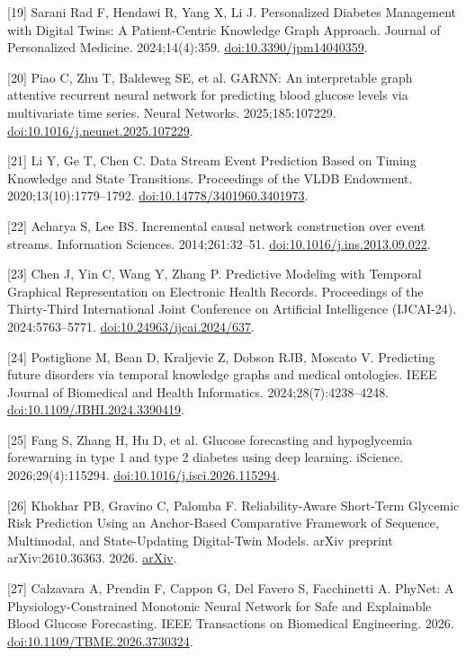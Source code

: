\documentclass[11pt,a4paper]{article}
\begin{document}
[19] Sarani Rad F, Hendawi R, Yang X, Li J. Personalized Diabetes Management with Digital Twins: A Patient-Centric Knowledge Graph Approach. Journal of Personalized Medicine. 2024;14(4):359. \href{https://doi.org/10.3390/jpm14040359}{doi:10.3390/jpm14040359}.

[20] Piao C, Zhu T, Baldeweg SE, et al. GARNN: An interpretable graph attentive recurrent neural network for predicting blood glucose levels via multivariate time series. Neural Networks. 2025;185:107229. \href{https://doi.org/10.1016/j.neunet.2025.107229}{doi:10.1016/j.neunet.2025.107229}.

[21] Li Y, Ge T, Chen C. Data Stream Event Prediction Based on Timing Knowledge and State Transitions. Proceedings of the VLDB Endowment. 2020;13(10):1779--1792. \href{https://doi.org/10.14778/3401960.3401973}{doi:10.14778/3401960.3401973}.

[22] Acharya S, Lee BS. Incremental causal network construction over event streams. Information Sciences. 2014;261:32--51. \href{https://doi.org/10.1016/j.ins.2013.09.022}{doi:10.1016/j.ins.2013.09.022}.

[23] Chen J, Yin C, Wang Y, Zhang P. Predictive Modeling with Temporal Graphical Representation on Electronic Health Records. Proceedings of the Thirty-Third International Joint Conference on Artificial Intelligence (IJCAI-24). 2024:5763--5771. \href{https://doi.org/10.24963/ijcai.2024/637}{doi:10.24963/ijcai.2024/637}.

[24] Postiglione M, Bean D, Kraljevic Z, Dobson RJB, Moscato V. Predicting future disorders via temporal knowledge graphs and medical ontologies. IEEE Journal of Biomedical and Health Informatics. 2024;28(7):4238--4248. \href{https://doi.org/10.1109/JBHI.2024.3390419}{doi:10.1109/JBHI.2024.3390419}.

[25] Fang S, Zhang H, Hu D, et al. Glucose forecasting and hypoglycemia forewarning in type 1 and type 2 diabetes using deep learning. iScience. 2026;29(4):115294. \href{https://doi.org/10.1016/j.isci.2026.115294}{doi:10.1016/j.isci.2026.115294}.

[26] Khokhar PB, Gravino C, Palomba F. Reliability-Aware Short-Term Glycemic Risk Prediction Using an Anchor-Based Comparative Framework of Sequence, Multimodal, and State-Updating Digital-Twin Models. arXiv preprint arXiv:2610.36363. 2026. \href{https://arxiv.org/abs/2610.36363}{arXiv}.

[27] Calzavara A, Prendin F, Cappon G, Del Favero S, Facchinetti A. PhyNet: A Physiology-Constrained Monotonic Neural Network for Safe and Explainable Blood Glucose Forecasting. IEEE Transactions on Biomedical Engineering. 2026. \href{https://doi.org/10.1109/TBME.2026.3730324}{doi:10.1109/TBME.2026.3730324}.
\end{document}
